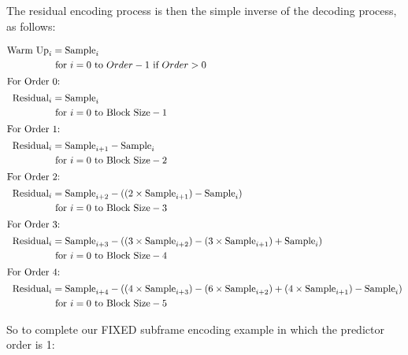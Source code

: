 \clearpage

The residual encoding process is then the simple inverse of the
decoding process, as follows:

\begin{align*}
\text{Warm Up}_i &= \text{Sample}_i \\
& \text{ for } i = 0 \text{ to } Order - 1 \text{ if } Order > 0\\
\intertext{For Order 0:}
\text{Residual}_i &= \text{Sample}_i \\
& \text{ for } i = 0 \text{ to Block Size} - 1 \\
\intertext{For Order 1:}
\text{Residual}_i &= \text{Sample}_{i + 1} - \text{Sample}_i \\
& \text{ for } i = 0 \text{ to Block Size} - 2 \\
\intertext{For Order 2:}
\text{Residual}_i &= \text{Sample}_{i + 2} - ((2 \times \text{Sample}_{i + 1}) - \text{Sample}_i) \\
& \text{ for } i = 0 \text{ to Block Size} - 3 \\
\intertext{For Order 3:}
\text{Residual}_i &= \text{Sample}_{i + 3} - ((3 \times \text{Sample}_{i + 2}) - (3 \times \text{Sample}_{i + 1}) + \text{Sample}_i) \\
& \text{ for } i = 0 \text{ to Block Size} - 4 \\
\intertext{For Order 4:}
\text{Residual}_i &= \text{Sample}_{i + 4} - ((4 \times \text{Sample}_{i + 3}) - (6 \times \text{Sample}_{i + 2}) + (4 \times \text{Sample}_{i + 1}) - \text{Sample}_i) \\
& \text{ for } i = 0 \text{ to Block Size} - 5 \\
\end{align*}

\clearpage

So to complete our FIXED subframe encoding example in which the
predictor order is 1:

